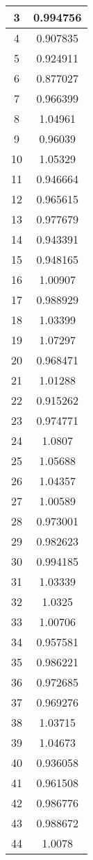 \begin{table}[h]
\begin{subtable}[h]{2in}
{\begin{tabular}{|c|c|}
3	&	0.994756	\\	\hline
4	&	0.907835	\\	\hline
5	&	0.924911	\\	\hline
6	&	0.877027	\\	\hline
7	&	0.966399	\\	\hline
8	&	1.04961	\\	\hline
9	&	0.96039	\\	\hline
10	&	1.05329	\\	\hline
11	&	0.946664	\\	\hline
12	&	0.965615	\\	\hline
13	&	0.977679	\\	\hline
14	&	0.943391	\\	\hline
15	&	0.948165	\\	\hline
16	&	1.00907	\\	\hline
17	&	0.988929	\\	\hline
18	&	1.03399	\\	\hline
19	&	1.07297	\\	\hline
20	&	0.968471	\\	\hline
21	&	1.01288	\\	\hline
22	&	0.915262	\\	\hline
23	&	0.974771	\\	\hline
24	&	1.0807	\\	\hline
25	&	1.05688	\\	\hline
26	&	1.04357	\\	\hline
27	&	1.00589	\\	\hline
28	&	0.973001	\\	\hline
29	&	0.982623	\\	\hline
30	&	0.994185	\\	\hline
31	&	1.03339	\\	\hline
32	&	1.0325	\\	\hline
33	&	1.00706	\\	\hline
34	&	0.957581	\\	\hline
35	&	0.986221	\\	\hline
36	&	0.972685	\\	\hline
37	&	0.969276	\\	\hline
38	&	1.03715	\\	\hline
39	&	1.04673	\\	\hline
40	&	0.936058	\\	\hline
41	&	0.961508	\\	\hline
42	&	0.986776	\\	\hline
43	&	0.988672	\\	\hline
44	&	1.0078	\\	\hline

\end{tabular}}
\end{subtable}
\end{table}
